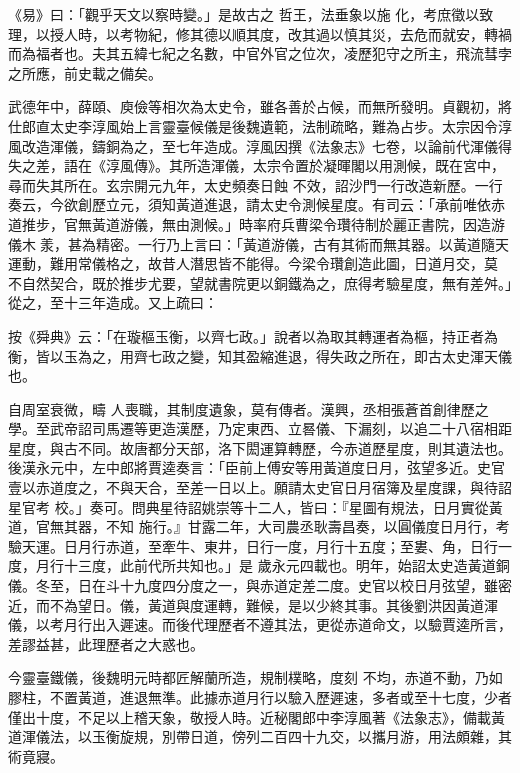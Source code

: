 
\begin{pinyinscope}

 《易》曰：「觀乎天文以察時變。」是故古之
 哲王，法垂象以施
 化，考庶徵以致理，以授人時，以考物紀，修其德以順其度，改其過以慎其災，去危而就安，轉禍而為福者也。夫其五緯七紀之名數，中官外官之位次，凌歷犯守之所主，飛流彗孛之所應，前史載之備矣。



 武德年中，薛頤、庾儉等相次為太史令，雖各善於占候，而無所發明。貞觀初，將仕郎直太史李淳風始上言靈臺候儀是後魏遺範，法制疏略，難為占步。太宗因令淳風改造渾儀，鑄銅為之，至七年造成。淳風因撰《法象志》七卷，以論前代渾儀得失之差，語在《淳風傳》。其所造渾儀，太宗令置於凝暉閣以用測候，既在宮中，尋而失其所在。玄宗開元九年，太史頻奏日蝕
 不效，詔沙門一行改造新歷。一行奏云，今欲創歷立元，須知黃道進退，請太史令測候星度。有司云：「承前唯依赤道推步，官無黃道游儀，無由測候。」時率府兵曹梁令瓚待制於麗正書院，因造游儀木羕，甚為精密。一行乃上言曰：「黃道游儀，古有其術而無其器。以黃道隨天運動，難用常儀格之，故昔人潛思皆不能得。今梁令瓚創造此圖，日道月交，莫
 不自然契合，既於推步尤要，望就書院更以銅鐵為之，庶得考驗星度，無有差舛。」從之，至十三年造成。又上疏曰：



 按《舜典》云：「在璇樞玉衡，以齊七政。」說者以為取其轉運者為樞，持正者為衡，皆以玉為之，用齊七政之變，知其盈縮進退，得失政之所在，即古太史渾天儀也。



 自周室衰微，疇
 人喪職，其制度遺象，莫有傳者。漢興，丞相張蒼首創律歷之學。至武帝詔司馬遷等更造漢歷，乃定東西、立晷儀、下漏刻，以追二十八宿相距星度，與古不同。故唐都分天部，洛下閎運算轉歷，今赤道歷星度，則其遺法也。後漢永元中，左中郎將賈逵奏言：「臣前上傅安等用黃道度日月，弦望多近。史官壹以赤道度之，不與天合，至差一日以上。願請太史官日月宿簿及星度課，與待詔星官考
 校。」奏可。問典星待詔姚崇等十二人，皆曰：『星圖有規法，日月實從黃道，官無其器，不知
 施行。』甘露二年，大司農丞耿壽昌奏，以圓儀度日月行，考驗天運。日月行赤道，至牽牛、東井，日行一度，月行十五度；至婁、角，日行一度，月行十三度，此前代所共知也。」是
 歲永元四載也。明年，始詔太史造黃道銅儀。冬至，日在斗十九度四分度之一，與赤道定差二度。史官以校日月弦望，雖密近，而不為望日。儀，黃道與度運轉，難候，是以少終其事。其後劉洪因黃道渾儀，以考月行出入遲速。而後代理歷者不遵其法，更從赤道命文，以驗賈逵所言，差謬益甚，此理歷者之大惑也。



 今靈臺鐵儀，後魏明元時都匠解蘭所造，規制樸略，度刻
 不均，赤道不動，乃如膠柱，不置黃道，進退無準。此據赤道月行以驗入歷遲速，多者或至十七度，少者僅出十度，不足以上稽天象，敬授人時。近秘閣郎中李淳風著《法象志》，備載黃道渾儀法，以玉衡旋規，別帶日道，傍列二百四十九交，以攜月游，用法頗雜，其術竟寢。




\end{pinyinscope}

